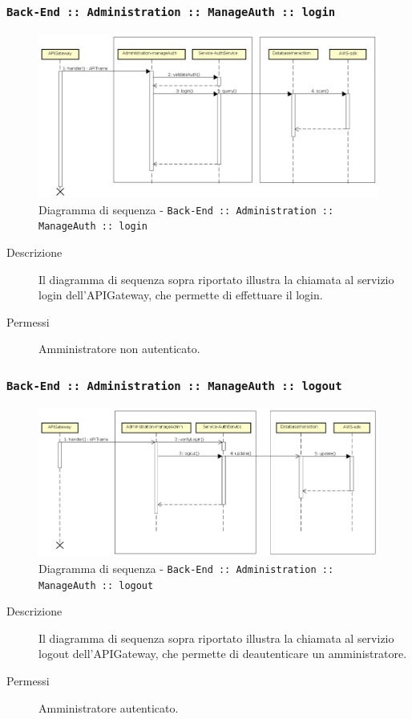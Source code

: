 \documentclass[../DefinizioneDiProdotto_v3.0.0.tex]{subfiles}
\begin{document}
\newpage
\subsubsection{\texttt{Back-End :: Administration :: ManageAuth :: login}}
\begin{figure}[!h]
	\centering
	\includegraphics[width=\textwidth]{DiagrammiSequenza/Back-End/manageAuth/login.png}
	\caption{Diagramma di sequenza - \texttt{Back-End :: Administration :: ManageAuth :: login }}
\end{figure}
\begin{description}
	\item [Descrizione] Il diagramma di sequenza sopra riportato illustra la chiamata al servizio login dell'APIGateway, che permette di effettuare il login.
	\item [Permessi] Amministratore non autenticato.
\end{description}

\subsubsection{\texttt{Back-End :: Administration :: ManageAuth :: logout}}
\begin{figure}[!h]
	\centering
	\includegraphics[width=\textwidth]{DiagrammiSequenza/Back-End/manageAuth/logout.png}
	\caption{Diagramma di sequenza - \texttt{Back-End :: Administration :: ManageAuth :: logout }}
\end{figure}
\begin{description}
	\item [Descrizione] Il diagramma di sequenza sopra riportato illustra la chiamata al servizio logout dell'APIGateway, che permette di deautenticare un amministratore.
	\item [Permessi] Amministratore autenticato.
\end{description}
\end{document}
